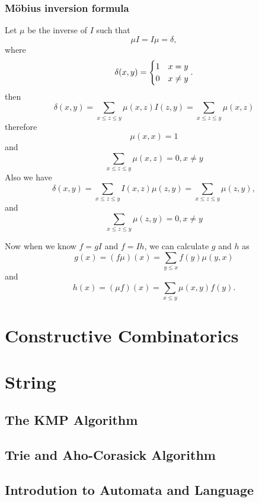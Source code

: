 \subsubsection{M\"obius inversion formula}
Let $\mu$ be the inverse of $I$ such that 
$$\mu I = I \mu = \delta,$$
where
$$\delta(x , y) = \begin{cases} 1 & x = y\cr 0 & x \neq y \end{cases}.$$
then $$\delta(x,y) = \sum_{x \leq z \leq y} \mu(x,z) I(z,y) 
= \sum_{x \leq z \leq y} \mu(x,z)$$
therefore $$\mu(x,x)=1$$
and $$\sum_{x \leq z \leq y}\mu(x,z) = 0, x \neq y$$
Also we have
$$\delta(x,y) = \sum_{x \leq z \leq y} I(x,z) \mu(z,y) 
= \sum_{x \leq z \leq y} \mu(z,y),$$
and $$\sum_{x \leq z \leq y}\mu(z,y) = 0, x \neq y$$

Now when we know $f=gI$ and $f=Ih$, 
we can calculate $g$ and $h$ as
$$g(x) = (f \mu)(x) = \sum_{y \leq x} f(y) \mu(y, x)$$
and 
$$h(x) = (\mu f)(x) = \sum_{x \leq y} \mu(x, y) f(y).$$


\section{Constructive Combinatorics}

\section{String}
\subsection{The KMP Algorithm}
\subsection{Trie and Aho-Corasick Algorithm}
\subsection{Introdution to Automata and Language}
